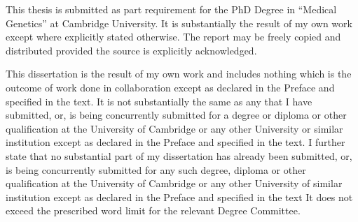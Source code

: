 
\begin{declaration}
This thesis is submitted as part requirement for the PhD Degree in ``Medical Genetics'' at Cambridge University.
It is substantially the result of my own work except where explicitly stated otherwise.
The report may be freely copied and distributed provided the source is explicitly acknowledged.

This dissertation is the result of my own work and includes nothing which is
the outcome of work done in collaboration except as declared in the Preface and
specified in the text.  It is not substantially the same as any that I have
submitted, or, is being concurrently submitted for a degree or diploma or other
qualification at the University of Cambridge or any other University or similar
institution except as declared in the Preface and specified in the text. I
further state that no substantial part of my dissertation has already been
submitted, or, is being concurrently submitted for any such degree, diploma or
other qualification at the University of Cambridge or any other University of
similar institution except as declared in the Preface and specified in the text
It does not exceed the prescribed word limit for the relevant Degree Committee.

\end{declaration}

